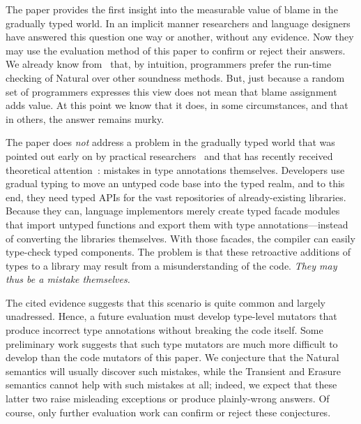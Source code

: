 The paper provides the first insight into the measurable value of blame
 in the gradually typed world. In an implicit manner researchers and
language designers have answered this question one way or another, without any
evidence. Now they may use the evaluation method of this paper to
confirm or reject their answers. We already know from~\citet{tgpk-dls-2018}
that, by intuition, programmers prefer the run-time checking of Natural over
other soundness methods. But, just because a random set of programmers expresses
this view does not mean that blame assignment adds value. At this point we know
that it does, in some circumstances, and that in others, the answer remains
murky.

The paper does {\em not\/} address a problem in the gradually typed world that
was pointed out early on by practical researchers~\cite{incorrect-ts,
sta-nt-base-types, wmwz-ecoop-2017} and that has recently received theoretical
attention~\cite{gfd-oopsla-2019, cc-oopsla-20}: mistakes in type annotations themselves.
Developers use gradual typing to move an untyped code base into the typed realm,
and to this end, they need typed APIs for the vast repositories of
already-existing libraries. Because they can, language implementors merely
create typed facade modules that import untyped functions and export them with
type annotations---instead of converting the libraries themselves. With those
facades, the compiler can easily type-check typed components. The problem is
that these retroactive additions of types to a library may result from a misunderstanding of the
code. \emph{They may thus be a mistake themselves.}

The cited evidence suggests that this scenario is quite common and largely unadressed.
Hence, a future evaluation must develop type-level mutators that produce incorrect type
annotations without breaking the code itself. Some preliminary work suggests
that such type mutators are much more difficult to develop than the code
mutators of this paper. We conjecture that the Natural semantics will
usually discover such mistakes, while the Transient and Erasure semantics cannot
help with such mistakes at all; indeed, we expect that these latter two raise
misleading exceptions or produce plainly-wrong answers.  Of course, only further
evaluation work can confirm or reject these conjectures.



